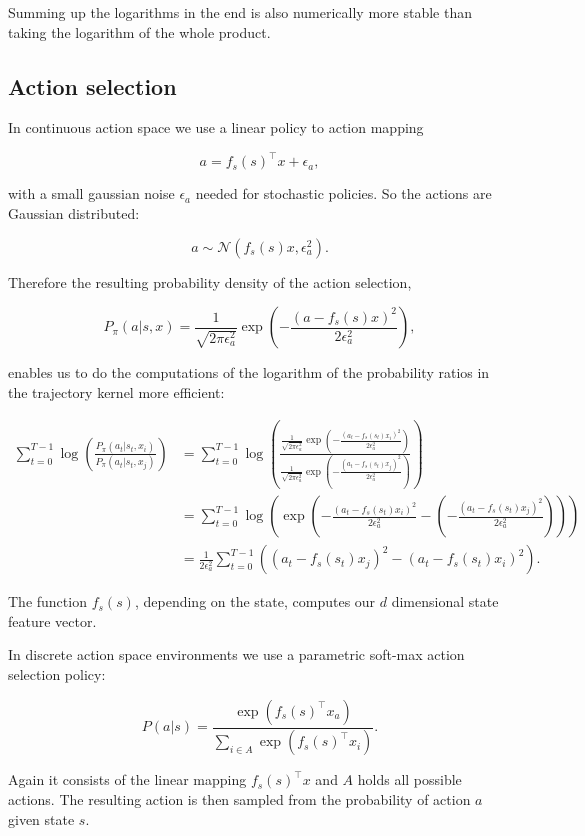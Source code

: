 Summing up the logarithms in the end is also numerically more stable than taking the logarithm of the whole product.

\subsection{Action selection}

In continuous action space we use a linear policy to action mapping

$$a = f_s(s)^\top x + \epsilon_a,$$

with a small gaussian noise $\epsilon_a$ needed for stochastic policies. So the actions are Gaussian distributed:

$$a \sim \mathcal{N}(f_s(s) x,\epsilon_a^2).$$

Therefore the resulting probability density of the action selection,

$$P_{\pi}(a|s,x) = \frac{1}{\sqrt{2\pi\epsilon_a^2}}\exp\left(-\frac{(a-f_s(s)x)^2}{2\epsilon_a^2}\right),$$

enables us to do the computations of the logarithm of the probability ratios in the trajectory kernel more efficient:

\begin{align*}
    \sum_{t=0}^{T-1} \log \left(\frac{P_{\pi}(a_{t}|s_{t},x_i)}{P_{\pi}(a_{t}|s_{t},x_j)}\right) &= \sum_{t=0}^{T-1} \log \left(\frac{\frac{1}{\sqrt{2\pi\epsilon_a^2}}\exp\left(-\frac{(a_t-f_s(s_t)x_i)^2}{2\epsilon_a^2}\right)}{\frac{1}{\sqrt{2\pi\epsilon_a^2}}\exp\left(-\frac{(a_t-f_s(s_t)x_j)^2}{2\epsilon_a^2}\right)}\right)\\
    &= \sum_{t=0}^{T-1} \log \left( \exp \left( -\frac{(a_t-f_s(s_t)x_i)^2}{2\epsilon_a^2} - \left(-\frac{(a_t-f_s(s_t)x_j)^2}{2\epsilon_a^2}\right)\right)\right)\\
    &= \frac{1}{2\epsilon_a^2} \sum_{t=0}^{T-1} \left((a_t-f_s(s_t)x_j)^2 - (a_t-f_s(s_t)x_i)^2\right).
\end{align*}

The function $f_s(s)$, depending on the state, computes our $d$ dimensional state feature vector.

In discrete action space environments we use a parametric soft-max action selection policy:

$$P(a|s)= \frac{\exp(f_s(s)^\top x_a)}{\sum_{i\in A} \exp(f_s(s)^\top x_i)}.$$

Again it consists of the linear mapping $f_s(s)^\top x$ and $A$ holds all possible actions. The resulting action is then sampled from the probability of action $a$ given state $s$.


